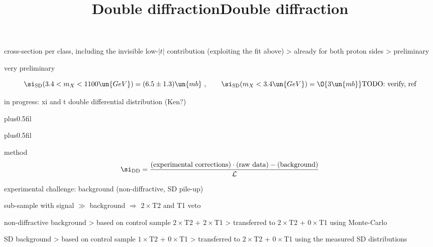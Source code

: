 \> cross-section per class, including the invisible low-$|t|$ contribution (exploiting the fit above)
\>> already for both proton sides
\>> preliminary

\centerline{}

\> very preliminary

$$\si_{\rm SD}(3.4 < m_X < 1100\un{GeV}) = (6.5 \pm 1.3)\un{mb}\ ,\qquad \si_{\rm SD}(m_X < 3.4\un{GeV}) = \O{3\un{mb}} \hbox{TODO: verify, ref}$$

\> in progress: xi and t double differential distribution (Ken?)

\newpage %
\hbox{}
\vfil
\title{Double diffraction}

\vskip0pt plus0.5fil

\vskip0pt plus0.5fil

\newpage %
\title{Double diffraction}

\vskip-3mm

\> method
$$\si_{\rm DD} = {\hbox{(experimental corrections)}\cdot\hbox{(raw data)} - \hbox{(background)}\over {\cal L}}$$

\> experimental challenge: background (non-diffractive, SD pile-up)


\centerline{\cYe sub-sample with signal $\gg$ background $\Rightarrow$  $2\times$T2 and T1 veto\cFg}


\> non-diffractive background
\>> based on control sample $2\times$T2 + $2\times$T1
\>> transferred to $2\times$T2 + $0\times$T1 using Monte-Carlo

\> SD background
\>> based on control sample $1\times$T2 + $0\times$T1
\>> transferred to $2\times$T2 + $0\times$T1 using the measured SD distributions


